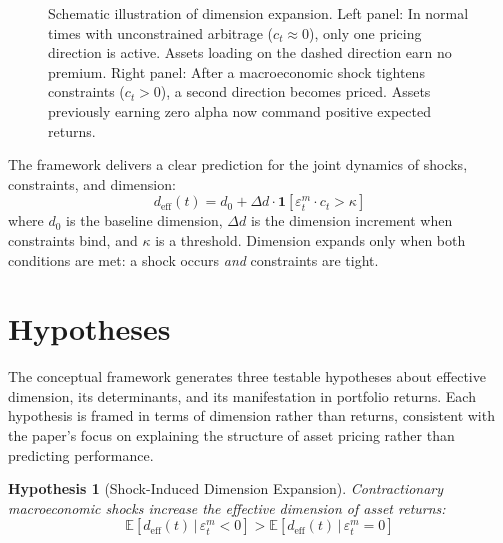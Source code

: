 \documentclass[12pt,letterpaper]{article}
\theoremstyle{plain}
\newtheorem{hypothesis}{Hypothesis}
\theoremstyle{definition}
\newcommand{\E}{\mathbb{E}}
\newcommand{\deff}{d_{\text{eff}}}
\begin{document}
\begin{figure}[htbp]
\caption{Schematic illustration of dimension expansion. Left panel: In normal times with unconstrained arbitrage ($c_t \approx 0$), only one pricing direction is active. Assets loading on the dashed direction earn no premium. Right panel: After a macroeconomic shock tightens constraints ($c_t > 0$), a second direction becomes priced. Assets previously earning zero alpha now command positive expected returns.}
\label{fig:dimension_diagram}
\end{figure}

The framework delivers a clear prediction for the joint dynamics of shocks, constraints, and dimension:
\begin{equation}\label{eq:dimension_dynamics}
\deff(t) = d_0 + \Delta d \cdot \mathbf{1}[\varepsilon_t^m \cdot c_t > \kappa]
\end{equation}
where $d_0$ is the baseline dimension, $\Delta d$ is the dimension increment when constraints bind, and $\kappa$ is a threshold. Dimension expands only when both conditions are met: a shock occurs \textit{and} constraints are tight.


\section{Hypotheses}\label{sec:hypotheses}

The conceptual framework generates three testable hypotheses about effective dimension, its determinants, and its manifestation in portfolio returns. Each hypothesis is framed in terms of dimension rather than returns, consistent with the paper's focus on explaining the structure of asset pricing rather than predicting performance.

\begin{hypothesis}[Shock-Induced Dimension Expansion]\label{hyp:shock}
Contractionary macroeconomic shocks increase the effective dimension of asset returns:
\begin{equation}
\E[\deff(t) \,|\, \varepsilon_t^m < 0] > \E[\deff(t) \,|\, \varepsilon_t^m = 0]
\end{equation}
\end{hypothesis}
\end{document}
